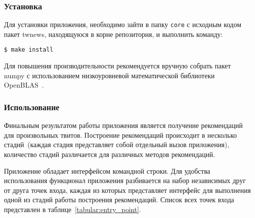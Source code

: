     \subsubsection{Установка}
        Для установки приложения, необходимо зайти в папку \lstinline{core} с исходным кодом пакет twnews, находящуюся в корне репозитория, и выполнить команду:
        \begin{lstlisting}
$ make install
        \end{lstlisting}
        Для повышения производительности рекомендуется вручную собрать пакет numpy с использованием низкоуровневой математической библиотеки OpenBLAS~\cite{blas_installation}.

    \subsubsection{Использование}
        Финальным результатом работы приложения является получение рекомендаций для произвольных твитов.
        Построение рекомендаций происходит в несколько стадий~(каждая стадия представляет собой отдельный вызов приложения),
        количество стадий различается для различных методов рекомендаций.

        Приложение обладает интерфейсом командной строки.
        Для удобства использования функционал приложения разбивается на набор независимых друг от друга точек входа,
        каждая из которых представляет интерфейс для выполнения одной из стадий работы построения рекомендаций.
        Список всех точек входа представлен в таблице~\ref{tabular:entry_point}.

